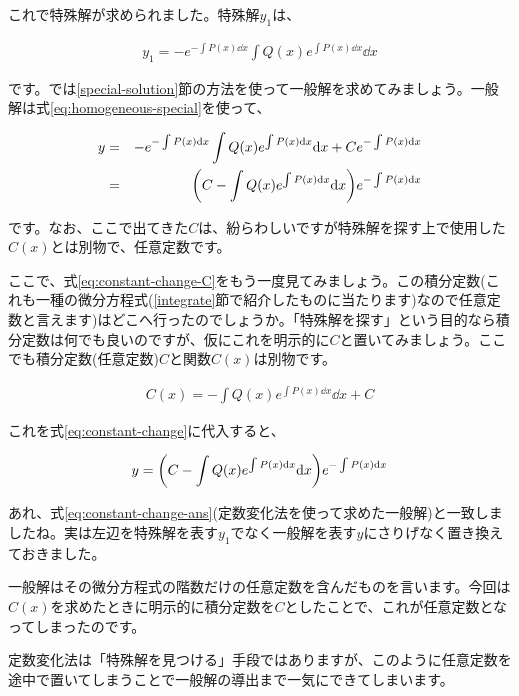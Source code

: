 これで特殊解が求められました。特殊解$y_1$は、

\begin{eqnarray}
    y_1=-e^{-\int P(x)\dd x}\int Q(x)e^{\int P(x)\dd x}\dd x
\end{eqnarray}

\noindent
です。では\ref{special-solution}節の方法を使って一般解を求めてみましょう。一般解は式\ref{eq:homogeneous-special}を使って、

\begin{eqnarray}
    y&=&-e^{-\int P(x)\dd x}\int Q(x)e^{\int P(x)\dd x}\dd x+Ce^{-\int P(x)\dd x} \nonumber \\
    &=&\pqty{C-\int Q(x)e^{\int P(x)\dd x}\dd x}e^{-\int P(x)\dd x}
    \label{eq:constant-change-ans}
\end{eqnarray}

\noindent
です。なお、ここで出てきた$C$は、紛らわしいですが特殊解を探す上で使用した$C(x)$とは別物で、任意定数です。

ここで、式\ref{eq:constant-change-C}をもう一度見てみましょう。この積分定数(これも一種の微分方程式(\ref{integrate}節で紹介したものに当たります)なので任意定数と言えます)はどこへ行ったのでしょうか。「特殊解を探す」という目的なら積分定数は何でも良いのですが、仮にこれを明示的に$C$と置いてみましょう。ここでも積分定数(任意定数)$C$と関数$C(x)$は別物です。

\begin{eqnarray}
    C(x)=-\int Q(x)e^{\int P(x)\dd x}\dd x+C
\end{eqnarray}

\noindent
これを式\ref{eq:constant-change}に代入すると、

\begin{eqnarray}
    y=\pqty{C-\int Q(x)e^{\int P(x)\dd x}\dd x}e^{-\int P(x)\dd x} \nonumber
\end{eqnarray}

あれ、式\ref{eq:constant-change-ans}(定数変化法を使って求めた一般解)と一致しましたね。実は左辺を特殊解を表す$y_1$でなく一般解を表す$y$にさりげなく置き換えておきました。

一般解はその微分方程式の階数だけの任意定数を含んだものを言います。今回は$C(x)$を求めたときに明示的に積分定数を$C$としたことで、これが任意定数となってしまったのです。

定数変化法は「特殊解を見つける」手段ではありますが、このように任意定数を途中で置いてしまうことで一般解の導出まで一気にできてしまいます。






